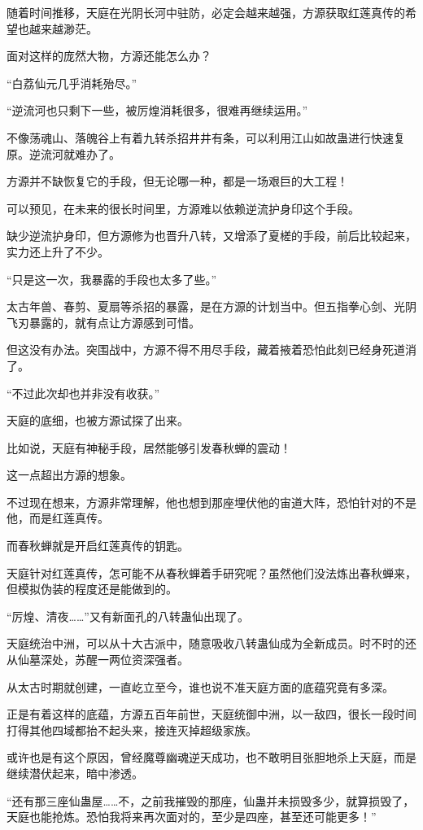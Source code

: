 \begin{this_body}
随着时间推移，天庭在光阴长河中驻防，必定会越来越强，方源获取红莲真传的希望也越来越渺茫。

面对这样的庞然大物，方源还能怎么办？

“白荔仙元几乎消耗殆尽。”

“逆流河也只剩下一些，被厉煌消耗很多，很难再继续运用。”

不像荡魂山、落魄谷上有着九转杀招井井有条，可以利用江山如故蛊进行快速复原。逆流河就难办了。

方源并不缺恢复它的手段，但无论哪一种，都是一场艰巨的大工程！

可以预见，在未来的很长时间里，方源难以依赖逆流护身印这个手段。

缺少逆流护身印，但方源修为也晋升八转，又增添了夏槎的手段，前后比较起来，实力还上升了不少。

“只是这一次，我暴露的手段也太多了些。”

太古年兽、春剪、夏扇等杀招的暴露，是在方源的计划当中。但五指拳心剑、光阴飞刃暴露的，就有点让方源感到可惜。

但这没有办法。突围战中，方源不得不用尽手段，藏着掖着恐怕此刻已经身死道消了。

“不过此次却也并非没有收获。”

天庭的底细，也被方源试探了出来。

比如说，天庭有神秘手段，居然能够引发春秋蝉的震动！

这一点超出方源的想象。

不过现在想来，方源非常理解，他也想到那座埋伏他的宙道大阵，恐怕针对的不是他，而是红莲真传。

而春秋蝉就是开启红莲真传的钥匙。

天庭针对红莲真传，怎可能不从春秋蝉着手研究呢？虽然他们没法炼出春秋蝉来，但模拟伪装的程度还是能做到的。

“厉煌、清夜……”又有新面孔的八转蛊仙出现了。

天庭统治中洲，可以从十大古派中，随意吸收八转蛊仙成为全新成员。时不时的还从仙墓深处，苏醒一两位资深强者。

从太古时期就创建，一直屹立至今，谁也说不准天庭方面的底蕴究竟有多深。

正是有着这样的底蕴，方源五百年前世，天庭统御中洲，以一敌四，很长一段时间打得其他四域都抬不起头来，接连灭掉超级家族。

或许也是有这个原因，曾经魔尊幽魂逆天成功，也不敢明目张胆地杀上天庭，而是继续潜伏起来，暗中渗透。

“还有那三座仙蛊屋……不，之前我摧毁的那座，仙蛊并未损毁多少，就算损毁了，天庭也能抢炼。恐怕我将来再次面对的，至少是四座，甚至还可能更多！”


\end{this_body}
